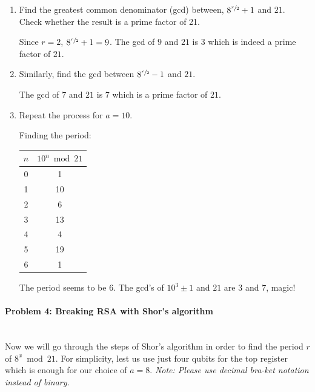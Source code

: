 \documentclass[12pt]{article}
\newenvironment{answer}{\begingroup\setlength{\leftskip}{-\leftmargin}\begin{framed}}{\end{framed}\endgroup}
\begin{document}
\begin{enumerate}
    \item Find the greatest common denominator (gcd) between, $8^{\sfrac{r}{2}} + 1$ and $21$. Check whether the result is a prime factor of 21.

    \begin{answer}
        Since $r = 2$, $8^{\sfrac{r}{2}} + 1 = 9$. The gcd of $9$ and $21$ is $3$ which is indeed a prime factor of $21$.
    \end{answer}

    \item Similarly, find the gcd between $8^{\sfrac{r}{2}} - 1$ and $21$.

    \begin{answer}
        The gcd of $7$ and $21$ is $7$ which is a prime factor of $21$.
    \end{answer}

    \item Repeat the process for $a = 10$.

    \begin{answer}
        Finding the period:
        \begin{tabular}{c|c}
            $n$ & $10^n \bmod 21$ \\
            \hline
            0 & 1 \\
            1 & 10 \\
            2 & 6 \\
            3 & 13 \\
            4 & 4 \\
            5 & 19 \\
            6 & 1 \\
        \end{tabular}
        The period seems to be $6$.
        The gcd's of $10^3 \pm 1$ and $21$ are $3$ and $7$, magic!
    \end{answer}
\end{enumerate}

\paragraph{Problem 4: Breaking RSA with Shor's algorithm} \hfill \\

Now we will go through the steps of Shor's algorithm in order to find the period $r$ of $8^x\bmod21$. For simplicity, lest us use just four qubits for the top register which is enough for our choice of $a = 8$.
\emph{Note: Please use decimal bra-ket notation instead of binary. }
\end{document}
